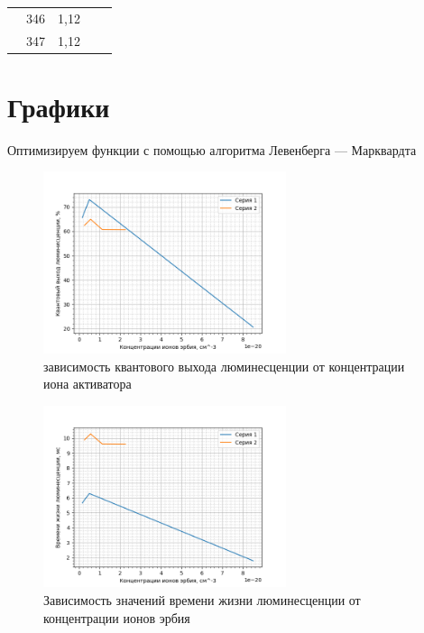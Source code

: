 \begin{table}[H]
{\begin{tabular}{|c|c|c|c|c|}
            & 346           & 1,12                                                                              &                                                                   &                                                                                            \\ \cline{2-3}
            & 347           & 1,12                                                                              &                                                                   &                                                                                            \\ \hline
\end{tabular}%
}
\end{table}

\section{Графики}\label{sec:graphics}

Оптимизируем функции с помощью алгоритма Левенберга — Марквардта\cite{levenberg1944method}
\begin{figure}[H]
	\centering
	\includegraphics[width=2.8in]{figures/ContcentrationTheory}
	\caption{зависимость квантового выхода люминесценции от
концентрации иона активатора}
	\label{fig:someFigure0}
\end{figure}

\begin{figure}[H]
	\centering
	\includegraphics[width=2.8in]{figures/Contcentration}
	\caption{Зависимость значений времени жизни люминесценции
от концентрации ионов эрбия}
	\label{fig:Concentration}
\end{figure}

